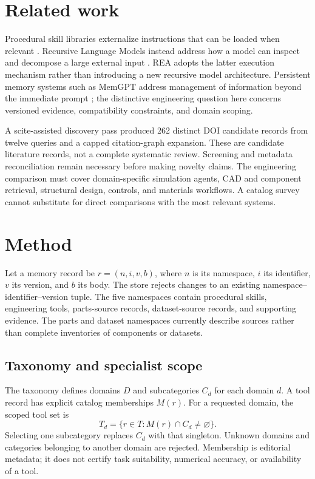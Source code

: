 \documentclass{article}
\begin{document}
\section{Related work}
Procedural skill libraries externalize instructions that can be loaded when relevant \citep{Kassis.2026}. Recursive Language Models instead address how a model can inspect and decompose a large external input \citep{Zhang.2025}. REA adopts the latter execution mechanism rather than introducing a new recursive model architecture. Persistent memory systems such as MemGPT address management of information beyond the immediate prompt \citep{Packer.2023}; the distinctive engineering question here concerns versioned evidence, compatibility constraints, and domain scoping.

A scite-assisted discovery pass produced 262 distinct DOI candidate records from twelve queries and a capped citation-graph expansion. These are candidate literature records, not a complete systematic review. Screening and metadata reconciliation remain necessary before making novelty claims. The engineering comparison must cover domain-specific simulation agents, CAD and component retrieval, structural design, controls, and materials workflows. A catalog survey cannot substitute for direct comparisons with the most relevant systems.

\section{Method}
Let a memory record be $r=(n,i,v,b)$, where $n$ is its namespace, $i$ its identifier, $v$ its version, and $b$ its body. The store rejects changes to an existing namespace--identifier--version tuple. The five namespaces contain procedural skills, engineering tools, parts-source records, dataset-source records, and supporting evidence. The parts and dataset namespaces currently describe sources rather than complete inventories of components or datasets.

\subsection{Taxonomy and specialist scope}
The taxonomy defines domains $D$ and subcategories $C_d$ for each domain $d$. A tool record has explicit catalog memberships $M(r)$. For a requested domain, the scoped tool set is
\begin{equation}
T_d = \{r\in T : M(r)\cap C_d\ne\varnothing\}.
\end{equation}
Selecting one subcategory replaces $C_d$ with that singleton. Unknown domains and categories belonging to another domain are rejected. Membership is editorial metadata; it does not certify task suitability, numerical accuracy, or availability of a tool.
\end{document}

